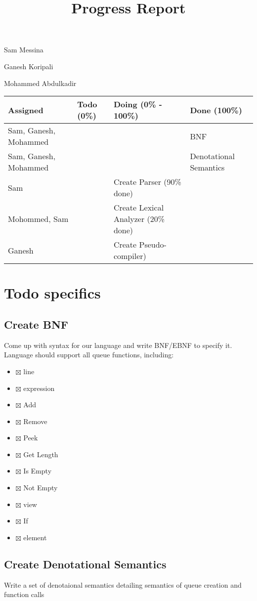 \documentclass[11pt]{article}
\date{}
\title{Progress Report}
\begin{document}
\maketitle
Sam Messina

Ganesh Koripali

Mohammed Abdulkadir

\begin{center}
\begin{tabular}{llll}
Assigned & Todo (0\%) & Doing (0\% - 100\%) & Done (100\%)\\
\hline
Sam, Ganesh, Mohammed &  &  & BNF\\
Sam, Ganesh, Mohammed &  &  & Denotational Semantics\\
Sam &  & Create Parser (90\% done) & \\
Mohommed, Sam &  & Create Lexical Analyzer (20\% done) & \\
Ganesh &  & Create Pseudo-compiler) & \\
\end{tabular}
\end{center}

\section{Todo specifics}
\label{sec:orga40c632}
\subsection{Create BNF}
\label{sec:org4112f6f}
Come up with syntax for our language and write BNF/EBNF to specify it. Language should support all queue functions, including:
\begin{itemize}
\item $\boxtimes$ line
\item $\boxtimes$ expression
\item $\boxtimes$ Add
\item $\boxtimes$ Remove
\item $\boxtimes$ Peek
\item $\boxtimes$ Get Length
\item $\boxtimes$ Is Empty
\item $\boxtimes$ Not Empty
\item $\boxtimes$ view
\item $\boxtimes$ If
\item $\boxtimes$ element
\end{itemize}
\subsection{Create Denotational Semantics}
\label{sec:orgc2e3225}
Write a set of denotaional semantics detailing semantics of queue creation and function calls
\end{document}
